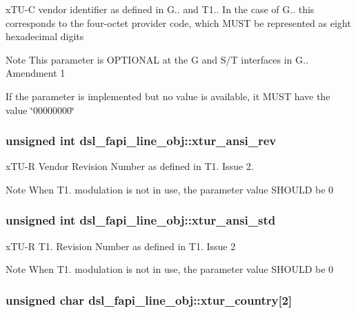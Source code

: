 x\-T\-U-\/\-C vendor identifier as defined in G.. and T1.. In the case of G.. this corresponds to the four-\/octet provider code, which M\-U\-S\-T be represented as eight hexadecimal digits \begin{DoxyNote}{Note}
This parameter is O\-P\-T\-I\-O\-N\-A\-L at the G and S/\-T interfaces in G.. Amendment 1 

If the parameter is implemented but no value is available, it M\-U\-S\-T have the value \char`\"{}00000000\char`\"{} 
\end{DoxyNote}
\hypertarget{structdsl__fapi__line__obj_a032c67a14b74d170a3bec92612000df2}{
\subsubsection[{xtur\-\_\-ansi\-\_\-rev}]{\setlength{\rightskip}{0pt plus 5cm}unsigned int dsl\-\_\-fapi\-\_\-line\-\_\-obj\-::xtur\-\_\-ansi\-\_\-rev}}\label{structdsl__fapi__line__obj_a032c67a14b74d170a3bec92612000df2}
x\-T\-U-\/\-R Vendor Revision Number as defined in T1. Issue 2. \begin{DoxyNote}{Note}
When T1. modulation is not in use, the parameter value S\-H\-O\-U\-L\-D be 0 
\end{DoxyNote}
\hypertarget{structdsl__fapi__line__obj_af1e0f2fc8496273a912920ee28c6c2f0}{
\subsubsection[{xtur\-\_\-ansi\-\_\-std}]{\setlength{\rightskip}{0pt plus 5cm}unsigned int dsl\-\_\-fapi\-\_\-line\-\_\-obj\-::xtur\-\_\-ansi\-\_\-std}}\label{structdsl__fapi__line__obj_af1e0f2fc8496273a912920ee28c6c2f0}
x\-T\-U-\/\-R T1. Revision Number as defined in T1. Issue 2 \begin{DoxyNote}{Note}
When T1. modulation is not in use, the parameter value S\-H\-O\-U\-L\-D be 0 
\end{DoxyNote}
\hypertarget{structdsl__fapi__line__obj_a54e206c0e002258adc6f36b24f5603ef}{
\subsubsection[{xtur\-\_\-country}]{\setlength{\rightskip}{0pt plus 5cm}unsigned char dsl\-\_\-fapi\-\_\-line\-\_\-obj\-::xtur\-\_\-country\mbox{[}2\mbox{]}}}\label{structdsl__fapi__line__obj_a54e206c0e002258adc6f36b24f5603ef}
